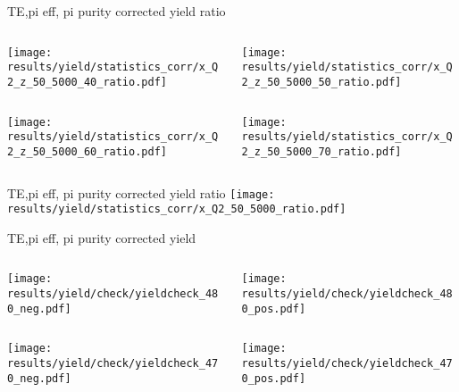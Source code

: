 \begin{frame}{TE,pi eff, pi purity corrected yield ratio}
\begin{columns}
\begin{column}[T]{0.5\textwidth}
\texttt{[image: results/yield/statistics\_corr/x\_Q2\_z\_50\_5000\_40\_ratio.pdf]}
\end{column}
\begin{column}[T]{0.5\textwidth}
\texttt{[image: results/yield/statistics\_corr/x\_Q2\_z\_50\_5000\_50\_ratio.pdf]}
\end{column}
\end{columns}
\begin{columns}
\begin{column}[T]{0.5\textwidth}
\texttt{[image: results/yield/statistics\_corr/x\_Q2\_z\_50\_5000\_60\_ratio.pdf]}
\end{column}
\begin{column}[T]{0.5\textwidth}
\texttt{[image: results/yield/statistics\_corr/x\_Q2\_z\_50\_5000\_70\_ratio.pdf]}
\end{column}
\end{columns}
\end{frame}
\begin{frame}{TE,pi eff, pi purity corrected yield ratio}
\texttt{[image: results/yield/statistics\_corr/x\_Q2\_50\_5000\_ratio.pdf]}
\end{frame}
\begin{frame}{TE,pi eff, pi purity corrected yield}
\begin{columns}
\begin{column}[T]{0.5\textwidth}
\texttt{[image: results/yield/check/yieldcheck\_480\_neg.pdf]}
\end{column}
\begin{column}[T]{0.5\textwidth}
\texttt{[image: results/yield/check/yieldcheck\_480\_pos.pdf]}
\end{column}
\end{columns}
\begin{columns}
\begin{column}[T]{0.5\textwidth}
\texttt{[image: results/yield/check/yieldcheck\_470\_neg.pdf]}
\end{column}
\begin{column}[T]{0.5\textwidth}
\texttt{[image: results/yield/check/yieldcheck\_470\_pos.pdf]}
\end{column}
\end{columns}
\end{frame}
